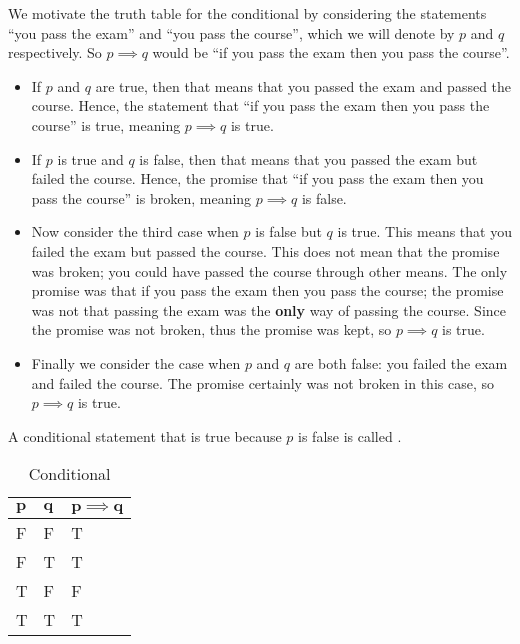 We motivate the truth table for the conditional by considering the statements ``you pass the exam'' and ``you pass the course'', which we will denote by $p$ and $q$ respectively. So $p \implies q$ would be ``if you pass the exam then you pass the course''.
\begin{itemize}
    \item If $p$ and $q$ are true, then that means that you passed the exam and passed the course. Hence, the statement that ``if you pass the exam then you pass the course'' is true, meaning $p \implies q$ is true.
    \item If $p$ is true and $q$ is false, then that means that you passed the exam but failed the course. Hence, the promise that ``if you pass the exam then you pass the course'' is broken, meaning $p \implies q$ is false.
    \item Now consider the third case when $p$ is false but $q$ is true. This means that you failed the exam but passed the course. This does not mean that the promise was broken; you could have passed the course through other means. The only promise was that if you pass the exam then you pass the course; the promise was not that passing the exam was the \textbf{only} way of passing the course. Since the promise was not broken, thus the promise was kept, so $p \implies q$ is true.
    \item Finally we consider the case when $p$ and $q$ are both false: you failed the exam and failed the course. The promise certainly was not broken in this case, so $p \implies q$ is true.
\end{itemize}
\begin{remark}
    A conditional statement that is true because $p$ is false is called .
\end{remark}

\begin{table}[h]
    \centering
    \begin{tabular}{|l|l||l|}
        \hline
        $\boldsymbol{p}$ & $\boldsymbol{q}$ & $\boldsymbol{p\implies q}$ \\ \hline
        F & F & T \\ \hline
        F & T & T \\ \hline
        T & F & F \\ \hline
        T & T & T \\ \hline
    \end{tabular}
    \caption{Conditional}
\end{table}

